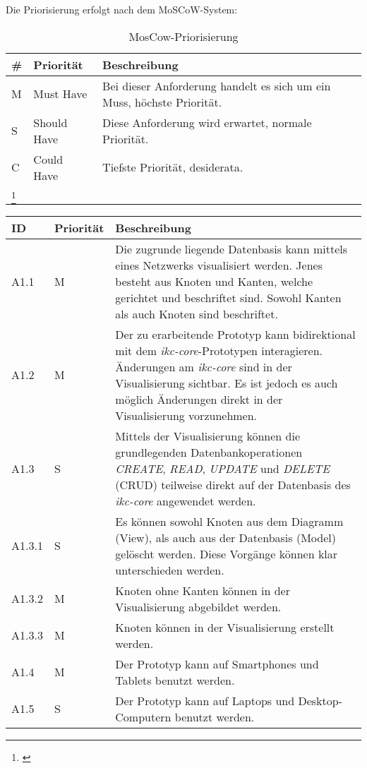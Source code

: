 Die Priorisierung erfolgt nach dem MoSCoW-System:

\begin{longtable}{|p{1.5cm} | p{2.5cm} | p{7.2cm}|}
  \hline
    \# & Priorität & Beschreibung \\\hline
    M & Must Have & Bei dieser Anforderung handelt es sich um ein Muss, höchste Priorität.\\\hline
    S & Should Have & Diese Anforderung wird erwartet, normale Priorität.\\\hline
    C & Could Have & Tiefste Priorität, desiderata.\\\hline
    \caption{MosCow-Priorisierung}
    \footnote{\cite{moscow:hardvard}}
  \label{tab:moscow}
\end{longtable}


\begin{longtable}{|p{1.5cm} | p{1.5cm} | p{8.1cm}|}
  \hline
    ID & Priorität & Beschreibung \\\hline
    A1.1 & M & Die zugrunde liegende Datenbasis kann mittels eines Netzwerks visualisiert werden. Jenes besteht aus Knoten und Kanten, welche gerichtet und beschriftet sind. Sowohl Kanten als auch Knoten sind beschriftet.\\\hline
    A1.2 & M & Der zu erarbeitende Prototyp kann bidirektional mit dem \textit{ikc-core}-Prototypen interagieren. Änderungen am \textit{ikc-core} sind in der Visualisierung sichtbar. Es ist jedoch es auch möglich Änderungen direkt in der Visualisierung vorzunehmen.\\\hline
    A1.3 & S & Mittels der Visualisierung können die grundlegenden Datenbankoperationen \textit{CREATE}, \textit{READ}, \textit{UPDATE} und \textit{DELETE} (CRUD) teilweise direkt auf der Datenbasis des \textit{ikc-core} angewendet werden.\\\hline
    A1.3.1 & S & Es können sowohl Knoten aus dem Diagramm (View), als auch aus der Datenbasis (Model) gelöscht werden. Diese Vorgänge können klar unterschieden werden.\\\hline
    A1.3.2 & M & Knoten ohne Kanten können in der Visualisierung abgebildet werden.\\\hline
    A1.3.3 & M & Knoten können in der Visualisierung erstellt werden.\\\hline
    A1.4 & M & Der Prototyp kann auf Smartphones und Tablets benutzt werden.\\\hline
    A1.5 & S & Der Prototyp kann auf Laptops und Desktop-Computern benutzt werden.\\\hline    

\end{longtable}
